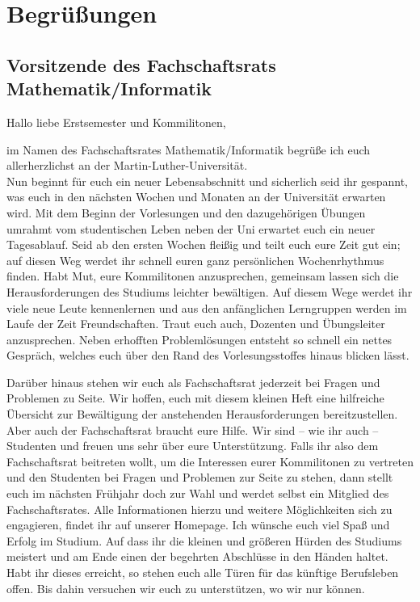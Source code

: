 \section{Begrüßungen}

\subsection{Vorsitzende des Fachschaftsrats Mathematik/Informatik}

Hallo liebe Erstsemester und Kommilitonen,

im Namen des Fachschaftsrates Mathematik/Informatik begrüße ich euch allerherzlichst an der Martin-Luther-Universität. \\
Nun beginnt für euch ein neuer Lebensabschnitt und sicherlich seid ihr gespannt, was euch in den nächsten Wochen und Monaten an der Universität erwarten wird. Mit dem Beginn der Vorlesungen und den dazugehörigen Übungen umrahmt vom studentischen Leben neben der Uni erwartet euch ein neuer Tagesablauf. 
Seid ab den ersten Wochen fleißig und teilt euch eure Zeit gut ein; auf diesen Weg werdet ihr schnell euren ganz persönlichen Wochenrhythmus finden.
Habt Mut, eure Kommilitonen anzusprechen, gemeinsam lassen sich die Herausforderungen des Studiums leichter bewältigen. Auf diesem Wege werdet ihr viele neue Leute kennenlernen und aus den anfänglichen Lerngruppen werden im Laufe der Zeit Freundschaften. Traut euch auch, Dozenten und Übungsleiter anzusprechen. Neben erhofften Problemlösungen entsteht so schnell ein nettes Gespräch, welches euch über den Rand des Vorlesungsstoffes hinaus blicken lässt.

Darüber hinaus stehen wir euch als Fachschaftsrat jederzeit bei Fragen und Problemen zu Seite. Wir hoffen, euch mit diesem kleinen Heft eine hilfreiche Übersicht zur Bewältigung der anstehenden Herausforderungen bereitzustellen.
Aber auch der Fachschaftsrat braucht eure Hilfe. Wir sind -- wie ihr auch -- Studenten und freuen uns sehr über eure Unterstützung. Falls ihr also dem Fachschaftsrat beitreten wollt, um die Interessen eurer Kommilitonen zu vertreten und den Studenten bei Fragen und Problemen zur Seite zu stehen, dann stellt euch im nächsten Frühjahr doch zur Wahl und werdet selbst ein Mitglied des Fachschaftsrates. Alle Informationen hierzu und weitere Möglichkeiten sich zu engagieren, findet ihr auf unserer Homepage.
Ich wünsche euch viel Spaß und Erfolg im Studium. Auf dass ihr die kleinen und größeren Hürden des Studiums meistert und am Ende einen der begehrten Abschlüsse in den Händen haltet. Habt ihr dieses erreicht, so stehen euch alle Türen für das künftige Berufsleben offen. Bis dahin versuchen wir euch zu unterstützen, wo wir nur können.

